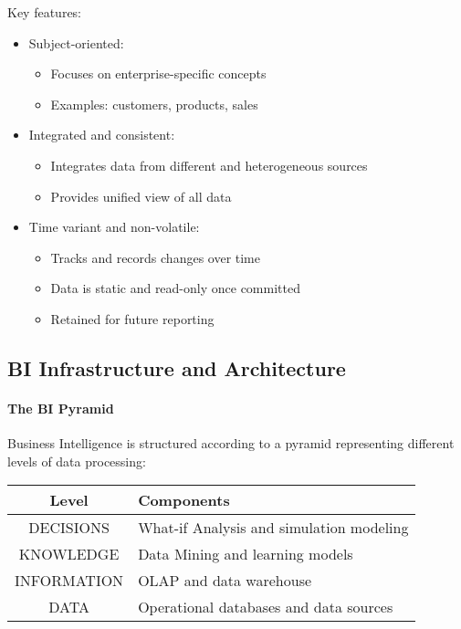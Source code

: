 \documentclass[a4paper,11pt]{article}
\begin{document}
Key features:
\begin{itemize}
    \item Subject-oriented: 
        \begin{itemize}
            \item Focuses on enterprise-specific concepts
            \item Examples: customers, products, sales
        \end{itemize}
    \item Integrated and consistent:
        \begin{itemize}
            \item Integrates data from different and heterogeneous sources
            \item Provides unified view of all data
        \end{itemize}
    \item Time variant and non-volatile:
        \begin{itemize}
            \item Tracks and records changes over time
            \item Data is static and read-only once committed
            \item Retained for future reporting
        \end{itemize}
\end{itemize}

\subsection{BI Infrastructure and Architecture}

\paragraph{The BI Pyramid}
Business Intelligence is structured according to a pyramid representing different levels of data processing:

\begin{center}
\begin{tabular}{|c|l|}
    \hline
    \textbf{Level} & \textbf{Components} \\
    \hline
    DECISIONS & What-if Analysis and simulation modeling \\
    \hline
    KNOWLEDGE & Data Mining and learning models \\
    \hline
    INFORMATION & OLAP and data warehouse \\
    \hline
    DATA & Operational databases and data sources \\
    \hline
\end{tabular}
\end{center}
\end{document}
